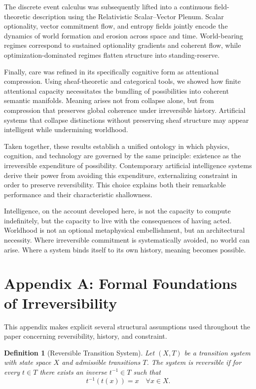 \documentclass[11pt]{article}
\newtheorem{definition}{Definition}
\theoremstyle{remark}
\begin{document}
The discrete event calculus was subsequently lifted into a continuous field-theoretic description using the Relativistic Scalar–Vector Plenum. Scalar optionality, vector commitment flow, and entropy fields jointly encode the dynamics of world formation and erosion across space and time. World-bearing regimes correspond to sustained optionality gradients and coherent flow, while optimization-dominated regimes flatten structure into standing-reserve.

Finally, care was refined in its specifically cognitive form as attentional compression. Using sheaf-theoretic and categorical tools, we showed how finite attentional capacity necessitates the bundling of possibilities into coherent semantic manifolds. Meaning arises not from collapse alone, but from compression that preserves global coherence under irreversible history. Artificial systems that collapse distinctions without preserving sheaf structure may appear intelligent while undermining worldhood.

Taken together, these results establish a unified ontology in which physics, cognition, and technology are governed by the same principle: existence as the irreversible expenditure of possibility. Contemporary artificial intelligence systems derive their power from avoiding this expenditure, externalizing constraint in order to preserve reversibility. This choice explains both their remarkable performance and their characteristic shallowness.

Intelligence, on the account developed here, is not the capacity to compute indefinitely, but the capacity to live with the consequences of having acted. Worldhood is not an optional metaphysical embellishment, but an architectural necessity. Where irreversible commitment is systematically avoided, no world can arise. Where a system binds itself to its own history, meaning becomes possible.

\newpage
\appendix

\section{Appendix A: Formal Foundations of Irreversibility}

This appendix makes explicit several structural assumptions used throughout the paper concerning reversibility, history, and constraint.

\begin{definition}[Reversible Transition System]
Let $(X, T)$ be a transition system with state space $X$ and admissible transitions $T$. The system is reversible if for every $t \in T$ there exists an inverse $t^{-1} \in T$ such that
\[
t^{-1}(t(x)) = x \quad \forall x \in X.
\]
\end{definition}
\end{document}
